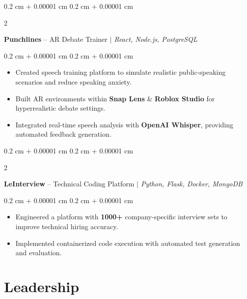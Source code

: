 \documentclass[10pt, letterpaper]{article}
\newenvironment{highlights}{
    \begin{itemize}[
        topsep=0.10 cm,
        parsep=0.10 cm,
        partopsep=0pt,
        itemsep=0pt,
        leftmargin=0.4 cm + 10pt
    ]
}{
    \end{itemize}
} %
\newenvironment{onecolentry}{
    \begin{adjustwidth}{
        0.2 cm + 0.00001 cm
    }{
        0.2 cm + 0.00001 cm
    }
}{
    \end{adjustwidth}
} %
\newenvironment{twocolentry}[2][]{
    \onecolentry
    \def\secondColumn{#2}
    \setcolumnwidth{\fill, 5 cm}
    \begin{paracol}{2}
}{
    \switchcolumn \raggedleft \secondColumn
    \end{paracol}
    \endonecolentry
} %
\let\hrefWithoutArrow\href
\renewcommand{\href}[2]{\hrefWithoutArrow{#1}{\ifthenelse{\equal{#2}{}}{ }{#2 }\raisebox{.15ex}{\footnotesize \faExternalLink*}}}
\begin{document}
        \vspace{0.3 cm}

        \begin{twocolentry}{}
            \textbf{Punchlines} -- AR Debate Trainer \textit{ $|$ React, Node.js, PostgreSQL}
        \end{twocolentry}

        \vspace{0.10 cm}
        \begin{onecolentry}
            \begin{highlights}
                \item Created speech training platform to simulate realistic public-speaking scenarios and reduce speaking anxiety.
                \item Built AR environments within \textbf{Snap Lens} \& \textbf{Roblox Studio} for hyperrealistic debate settings.
                \item Integrated real-time speech analysis with \textbf{OpenAI Whisper}, providing automated feedback generation.
            \end{highlights}
        \end{onecolentry}


        \vspace{0.3 cm}

        \begin{twocolentry}{}
            \textbf{LeInterview} -- Technical Coding Platform \textit{ $|$ Python, Flask, Docker, MongoDB}
        \end{twocolentry}

        \vspace{0.10 cm}
        \begin{onecolentry}
            \begin{highlights}
                \item Engineered a platform with \textbf{1000+} company-specific interview sets to improve technical hiring accuracy.
                \item Implemented containerized code execution with automated test generation and evaluation.
            \end{highlights}
        \end{onecolentry}


    \section{Leadership}
\end{document}
